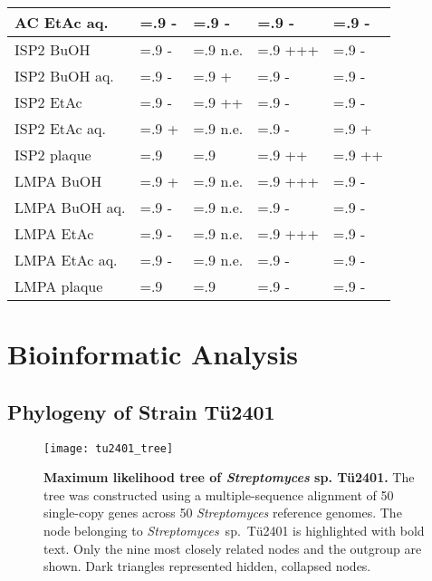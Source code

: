 \begin{table}[htbp]
\begin{tabularx}{\textwidth}{>{\hsize=1.4\hsize}X>{\hsize=.9\hsize}X>{\hsize=.9\hsize}X>{\hsize=.9\hsize}X>{\hsize=.9\hsize}X}
            AC EtAc aq.     & -     & -     & -     & -    \\
            \midrule
            ISP2 BuOH       & -     & n.e.  & +++   & -    \\
            ISP2 BuOH aq.   & -     & +     & -     & -    \\
            ISP2 EtAc       & -     & ++    & -     & -    \\
            ISP2 EtAc aq.   & +     & n.e.  & -     & +    \\
            ISP2 plaque     &       &       & ++    & ++   \\
            \midrule
            LMPA BuOH       & +     & n.e.  & +++   & -    \\
            LMPA BuOH aq.   & -     & n.e.  & -     & -    \\
            LMPA EtAc       & -     & n.e.  & +++   & -    \\
            LMPA EtAc aq.   & -     & n.e.  & -     & -    \\
            LMPA plaque     &       &       & -     & -    \\
            \bottomrule
        \end{tabularx}
    \end{table}


\section{Bioinformatic Analysis} %
\label{sec:species_antismash}

    \subsection{Phylogeny of Strain Tü2401} %
    \label{sub:phylogeny_of_strain_tue2401}

	\begin{figure}[htbp]
		\texttt{[image: tu2401\_tree]}
		\caption[Maximum likelihood tree of \emph{Streptomyces} sp. Tü2401.]{%
			\textbf{Maximum likelihood tree of \emph{Streptomyces} sp. Tü2401.}
			The tree was constructed using a multiple-sequence alignment of 50 single-copy genes across 50 \textit{Streptomyces} reference genomes.
			The node belonging to \textit{Streptomyces}~sp.~Tü2401 is highlighted with bold text.
			Only the nine most closely related nodes and the outgroup are shown.
			Dark triangles represented hidden, collapsed nodes.}
		\label{fig:phylo_tree} 
	\end{figure}

